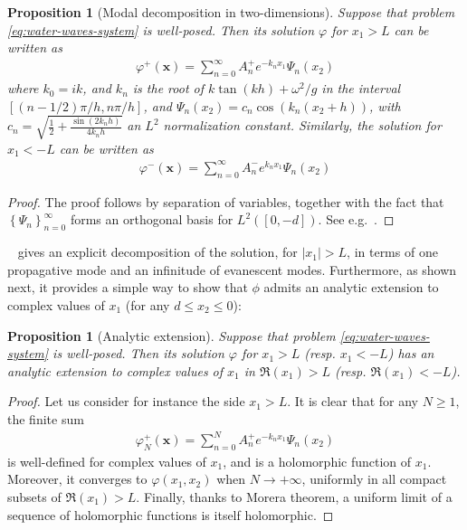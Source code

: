 \documentclass[11pt]{article}
\newcommand{\bx}{\mathbf{x}}
\newtheorem{proposition}[theorem]{Proposition}
\begin{document}
\begin{proposition}[Modal decomposition in two-dimensions]
  \label{prop:modal-decomposition}
  Suppose that problem \cref{eq:water-waves-system} is well-posed. Then its
  solution $\varphi$ for $x_1>L$ can be written as
  \begin{align}
    \varphi^+(\bx) = \sum_{n=0}^{\infty} A_n^+ e^{-k_n x_1} \Psi_n(x_2)
  \end{align}
  where $k_0 = ik$, and $k_n$ is the root of $k \tan(kh) + \omega^2/g$ in the
  interval $[(n-1/2)\pi/h, n\pi/h]$, and $\Psi_n(x_2) = c_n \cos(k_n (x_2 +
  h))$, with $c_n = \sqrt{ \frac{1}{2} + \frac{\sin(2 k_n h)}{4k_n h}}$ an $L^2$
  normalization constant. Similarly, the solution for $x_1 < -L$ can be written
  as
  \begin{align}
    \varphi^-(\bx) = \sum_{n=0}^{\infty} A_n^- e^{k_n x_1} \Psi_n(x_2)
  \end{align}
\end{proposition}
\begin{proof}
The proof follows by separation of variables, together with the fact that
$\left\{\Psi_n \right\}_{n=0}^\infty$ forms an orthogonal basis for $L^2([0,-d])$.
See e.g.~\cite[section 2.1]{linton2001handbook}.
\end{proof}

~ gives an explicit decomposition of the
solution, for $|x_1| > L$, in terms of one propagative mode and an infinitude of
evanescent modes. Furthermore, as shown next, it provides a simple way to show
that $\phi$ admits an analytic extension to complex values of $x_1$ (for any $d
\leq x_2 \leq 0$):

\begin{proposition}[Analytic extension]
  \label{prop:analyticity}
  Suppose that problem \cref{eq:water-waves-system} is well-posed. Then its solution $\varphi$ for $x_1>L$ (resp. $x_1<-L$)  has an analytic extension to complex values of $x_1$ in $\Re(x_1)>L$ (resp. $\Re(x_1)<-L$). 
\end{proposition}
\begin{proof}
Let us consider for instance the side $x_1>L$. It is clear that for any $N \geq
1$, the finite sum 
\begin{align}
  \varphi_N^+(\bx) = \sum_{n=0}^{N} A_n^+ e^{-k_n x_1} \Psi_n(x_2)
\end{align}
is well-defined for complex values of $x_1$, and is a holomorphic function of
$x_1$. Moreover, it converges to $\varphi(x_1,x_2)$ when $N\to +\infty$,
uniformly in all compact subsets of $\Re(x_1)>L$.  Finally, thanks to Morera
theorem, a uniform limit of a sequence of holomorphic functions is itself
holomorphic.
\end{proof}
\end{document}
